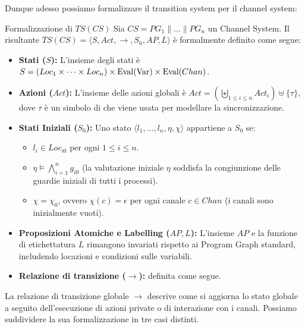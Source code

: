 Dunque adesso possiamo formalizzare il transition system per il channel system:

\begin{definition}{Formalizzazione di \(TS(CS)\)}
  Sia \(CS = PG_1 \parallel \dots \parallel PG_n\) un Channel System. Il  risultante \(TS(CS) = \langle S, Act, \to, S_0, AP, L \rangle\) è formalmente definito come segue:

  \begin{itemize}
    \item \textbf{Stati (\(S\)):} L'insieme degli stati è \(S = (Loc_1 \times \cdots \times Loc_n) \times \operatorname{Eval}(\operatorname{Var}) \times \operatorname{Eval}(Chan)\).
    \item \textbf{Azioni (\(Act\)):} L'insieme delle azioni globali è \(Act = \left(\biguplus_{1 \le i \le n} Act_i\right) \uplus \{\tau\}\), dove \(\tau\) è un simbolo di  che viene usata per modellare la sincronizzazione.
    \item \textbf{Stati Iniziali (\(S_0\)):} Uno stato \(\langle l_1, \dots, l_n, \eta, \chi \rangle\) appartiene a \(S_0\) se:
          \begin{itemize}
            \item \(l_i \in Loc_{i0}\) per ogni \(1 \le i \le n\).
            \item \(\eta \models \bigwedge_{i=1}^n g_{i0}\) (la valutazione iniziale \(\eta\) soddisfa la congiunzione delle guardie iniziali di tutti i processi).
            \item \(\chi = \chi_0\), ovvero \(\chi(c) = \epsilon\) per ogni canale \(c \in Chan\) (i canali sono inizialmente vuoti).
          \end{itemize}
    \item \textbf{Proposizioni Atomiche e Labelling (\(AP, L\)):} L'insieme \(AP\) e la funzione di etichettatura \(L\) rimangono invariati rispetto ai Program Graph standard, includendo locazioni e condizioni sulle variabili.
    \item \textbf{Relazione di transizione (\(\to\)):} definita come segue.
  \end{itemize}
\end{definition}

La relazione di transizione globale \(\to\) descrive come si aggiorna lo stato globale a seguito dell'esecuzione di azioni private o di interazione con i canali. Possiamo suddividere la sua formalizzazione in tre casi distinti.

